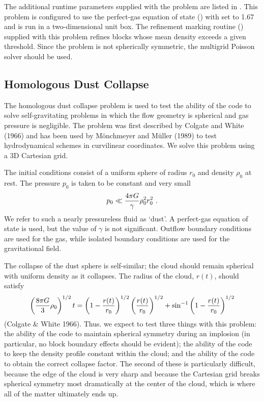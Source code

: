 The additional runtime parameters supplied with the 
problem are listed in . This problem is
configured to use the perfect-gas equation of state ()
with  set to 1.67 and is run in a two-dimensional unit
box.  The refinement marking routine ()
supplied with this problem refines blocks whose mean density exceeds
a given threshold.  Since the problem is not spherically symmetric,
the multigrid Poisson solver should be used.
\clearpage


\subsection{Homologous Dust Collapse}
\label{Sec:SimulationDustCollapse}

The homologous dust collapse problem 
is used to test the ability
of the code to solve self-gravitating problems in which the flow
geometry is spherical and gas pressure is negligible. The problem was
first described by Colgate and White (1966) and has been used by
M\"onchmeyer and M\"uller (1989) to test hydrodynamical schemes in
curvilinear coordinates.  We solve this problem using a 3D Cartesian
grid.

The initial conditions consist of a uniform sphere of radius $r_0$ and
density $\rho_0$ at rest.  The pressure $p_0$ is taken to be constant and
very small
\begin{equation}
p_0 \ll {4\pi G\over\gamma}\rho_0^2 r_0^2\ .
\end{equation}
We refer to such a nearly pressureless fluid as `dust'. A perfect-gas
equation of state is used, but the value of $\gamma$ is not significant.
Outflow boundary conditions are used for the gas, while isolated boundary
conditions are used for the gravitational field.

The collapse of the dust sphere is self-similar; the cloud should remain
spherical with uniform density as it collapses. The radius of the cloud,
$r(t)$, should satisfy
\begin{equation}
\label{Eqn:dust radius}
\left({8\pi G\over 3}\rho_0\right)^{1/2} t =
\left(1-{r(t)\over r_0}\right)^{1/2}\left({r(t)\over r_0}\right)^{1/2} +
\sin^{-1}\left(1-{r(t)\over r_0}\right)^{1/2}
\end{equation}
(Colgate \& White 1966).
Thus. we expect to test three things with this problem: the ability of the
code to maintain spherical symmetry during an implosion (in particular,
no block boundary effects should be evident); the ability of the code to
keep the density profile constant within the cloud; and the ability of the
code to obtain the correct collapse factor. The second of these is particularly
difficult, because the edge of the cloud is very sharp and because the
Cartesian grid breaks spherical symmetry most dramatically at the center of the
cloud, which is where all of the matter ultimately ends up.

